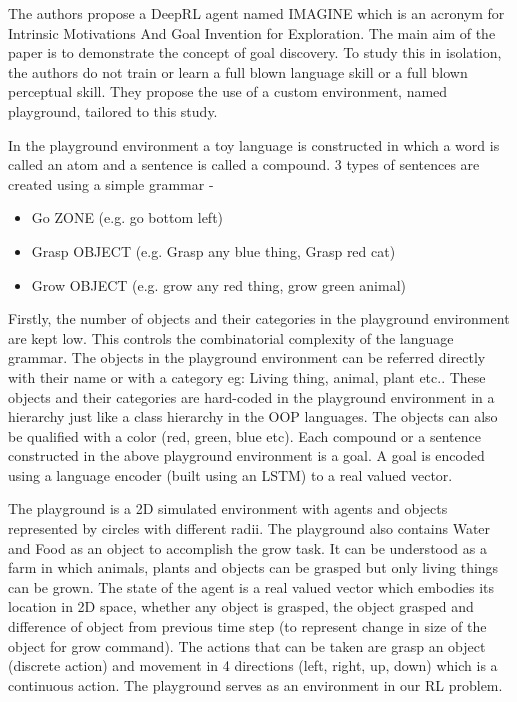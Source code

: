 \documentclass[10pt]{article}
\begin{document}
The authors propose a DeepRL agent named IMAGINE which is an acronym for Intrinsic Motivations And Goal Invention for Exploration.
The main aim of the paper is to demonstrate the concept of goal discovery.
To study this in isolation, the authors do not train or learn a full blown language skill or a full blown perceptual skill.
They propose the use of a custom environment, named playground, tailored to this study.

In the playground environment a toy language is constructed in which a word is called an atom and a sentence is called a compound. 
3 types of sentences are created using a simple grammar -
\begin{itemize}
  \item Go ZONE (e.g. go bottom left)
  \item Grasp OBJECT (e.g. Grasp any blue thing,  Grasp red cat)
  \item Grow OBJECT (e.g. grow any red thing,  grow green animal)
\end{itemize}
Firstly,  the number of objects and their categories in the playground environment are kept low.
This controls the combinatorial complexity of the language grammar.
The objects in the playground environment can be referred directly with their name or with a category eg: Living thing, animal, plant etc.. These objects and their categories are hard-coded in the playground environment in a hierarchy just like a class hierarchy in the OOP languages.
The objects can also be qualified with a color (red, green, blue etc).
Each compound or a sentence constructed in the above playground environment is a goal.
A goal is encoded using a language encoder (built using an LSTM) to a real valued vector.

The playground is a 2D simulated environment with agents and objects represented by circles with different radii.
The playground also contains Water and Food as an object to accomplish the grow task.
It can be understood as a farm in which animals, plants and objects can be grasped but only living things can be grown.
The state of the agent is a real valued vector which embodies its location in 2D space, whether any object is grasped, the object grasped and difference of object from previous time step (to represent change in size of the object for grow command).
The actions that can be taken are grasp an object (discrete action) and movement in 4 directions (left, right, up, down) which is a continuous action.
The playground serves as an environment in our RL problem.
\end{document}
